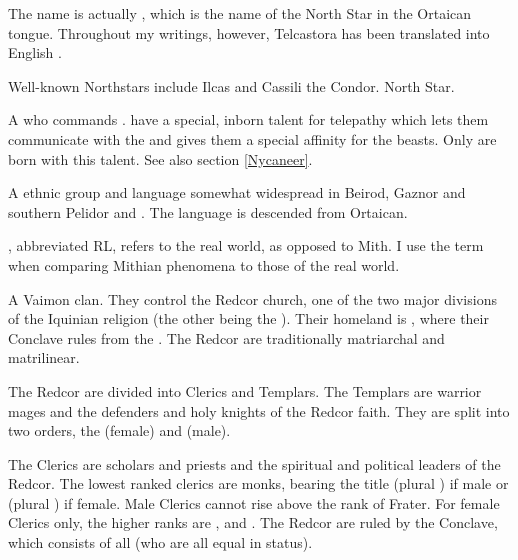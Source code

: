 \begin{gloss}
The name  is actually , which is the name of the North Star in the Ortaican tongue. Throughout my writings, however, Telcastora has been translated into English . 

Well-known Northstars include Ilcas and Cassili the Condor. 
\also North Star. 



\gitem{\nycaneer{}}
A \scatha{} who commands \nycans{}. \Nycaneers{} have a special, inborn talent for telepathy which lets them communicate with the \nycans{} and gives them a special affinity for the beasts. Only \scathae{} are born with this talent. See also section \ref{Nycaneer}. 
\also{\nycan{}}



\begin{comment}
\subsubsection{O-U}
\end{comment}

\gitempl{\Ortican}{\Orticans}
A \scathaese{} ethnic group and language somewhat widespread in Beirod, Gaznor and southern Pelidor and \Scyrum. The \Ortic{} language is descended from Ortaican.









, abbreviated RL, refers to the real world, as opposed to Mith. I use the term when comparing Mithian phenomena to those of the real world. 



A Vaimon clan. They control the Redcor church, one of the two major divisions of the Iquinian religion (the other being the \Yrgell{}). Their homeland is \Redce, where their Conclave rules from the \TopazChateau. The Redcor are traditionally matriarchal and matrilinear. 

The Redcor are divided into Clerics and Templars. The Templars are warrior mages and the defenders and holy knights of the Redcor faith. They are split into two orders, the \ryzin{} (female) and \gandierre{} (male). 

The Clerics are scholars and priests and the spiritual and political leaders of the Redcor. The lowest ranked clerics are monks, bearing the title \emph{\frater} (plural \emph{\fratres}) if male or \emph{\soror} (plural \emph{\sorores}) if female. Male Clerics cannot rise above the rank of Frater. For female Clerics only, the higher ranks are \mater, \matron and \matriarch. The Redcor are ruled by the Conclave, which consists of all \matriarchs{} (who are all equal in status). 


\end{gloss}
